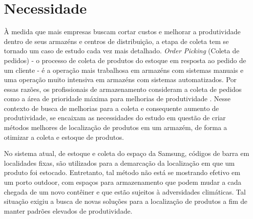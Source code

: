\chapter{Necessidade}
\textual
À medida que mais empresas buscam cortar custos e melhorar a produtividade dentro de seus armazéns e centros de distribuição, a etapa de coleta tem se tornado um caso de estudo cada vez mais detalhado. \textit{Order Picking} (Coleta de pedidos) - o processo de coleta de produtos do estoque em resposta ao pedido de um cliente - é a operação mais trabalhosa em armazéns com sistemas manuais e uma operação muito intensiva em armazéns com sistemas automatizados. Por essas razões, os profissionais de armazenamento consideram a coleta de pedidos como a área de prioridade máxima para melhorias de produtividade \cite{art3}.
Nesse contexto de busca de melhorias para a coleta e consequente aumento de produtividade, se encaixam as necessidades do estudo em questão de criar métodos melhores de localização de produtos em um armazém, de forma a otimizar a coleta e estoque de produtos.

No sistema atual, de estoque e coleta do espaço da Samsung, códigos de barra em localidades fixas, são utilizados para a demarcação da localização em que um produto foi estocado. Entretanto, tal método não está se mostrando efetivo em um porto outdoor, com espaços para armazenamento que podem mudar a cada chegada de um novo contêiner e que estão sujeitos à adversidades climáticas. Tal situação exigiu a busca de novas soluções para a localização de produtos a fim de manter padrões elevados de produtividade.
